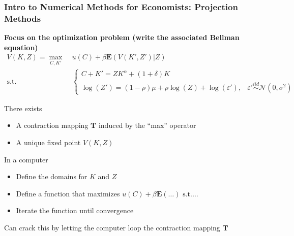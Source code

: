 \documentclass[10pt, aspectratio=1610]{beamer}
\newcommand{\E}{\mathbf{E}}
\begin{document}
  \begin{frame}
    \frametitle{Intro to Numerical Methods for Economists: Projection Methods}

    \textbf{Focus on the optimization problem (write the associated Bellman equation)}
    \begin{align*}
      V(K, Z) = \max_{C, K'} &\; u(C) + \beta \E \left( V(K', Z') | Z \right) \\
      \text{s.t.} &\; \begin{cases}
        C + K' = Z K^\alpha + (1 + \delta) K \\
        \log(Z') = (1-\rho) \mu + \rho \log(Z) + \log(\varepsilon'), & \varepsilon' \overset{iid}{\sim} \mathcal{N}(0, \sigma^2) %
      \end{cases}
    \end{align*}

    \vfill\pause

    There exists
    \begin{itemize}
      \item A contraction mapping $\mathbf{T}$ induced by the ``max'' operator
      \item A unique fixed point $V(K, Z)$
    \end{itemize}

    \vfill\pause

    In a computer
    \begin{itemize}
      \item Define the domains for $K$ and $Z$
      \item Define a function that maximizes $u(C) + \beta \E (\ldots) \text{ s.t.} \ldots$
      \item Iterate the function until convergence
    \end{itemize}

    \vfill\pause

    Can crack this by letting the computer loop the contraction mapping $\mathbf{T}$

  \end{frame}
\end{document}
